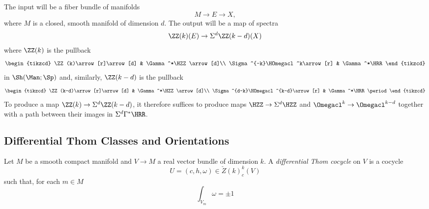The input will be a fiber bundle of manifolds
\begin{equation*}
	M\to E\to X \comma
\end{equation*}
where $ M $ is a closed, smooth manifold of dimension $ d $.
The output will be a map of %
spectra
\begin{equation*}
	\ZZ(k)(E)\to\Sigma^{d}\ZZ(k-d)(X)
\end{equation*}
where $\ZZ(k)$ is the pullback 
\begin{equation*}
	\begin{tikzcd}
		\ZZ(k)\arrow[r]\arrow[d] & \Gamma^*\HZZ\arrow[d]\\
		\Sigma^{-k}\HOmegacl^k\arrow[r] & \Gamma^*\HRR
	\end{tikzcd}
\end{equation*}
in $\Sh(\Man;\Sp)$ and, similarly, $\ZZ(k-d)$ is the pullback
\begin{equation*}
	\begin{tikzcd}
		\ZZ(k-d)\arrow[r]\arrow[d] & \Gamma^*\HZZ\arrow[d]\\
	\Sigma^{d-k}\HOmegacl^{k-d}\arrow[r] & \Gamma^*\HRR \period
	\end{tikzcd}
\end{equation*}
To produce a map $\ZZ(k)\to\Sigma^d\ZZ(k-d)$, it therefore suffices to produce maps $\HZZ\to\Sigma^d \HZZ $ and $\Omegacl^k\to\Omegacl^{k-d}$
 together with a path between their images in $\Sigma^{d}\Gamma^*\HRR$.


\subsection{Differential Thom Classes and Orientations}

\begin{definition}
	Let $M$ be a smooth compact manifold and $V\to M$ a real vector bundle of dimension $k$. 
	A \emph{differential Thom cocycle} on $V$ is a cocycle
	\begin{equation*}
		U=(c,h,\omega)\in \check{Z}(k)^k_c(V)
	\end{equation*}
	such that, for each $m\in M$
	\begin{equation*}
		\int_{V_m}\omega =\pm 1
	\end{equation*}
\end{definition}

